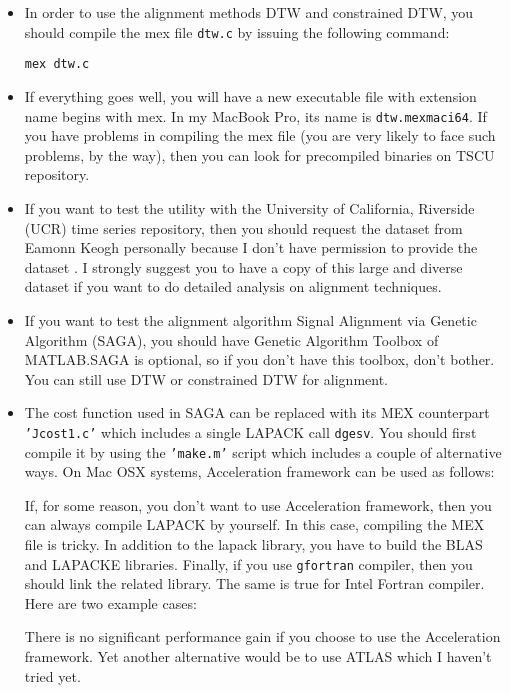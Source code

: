 \documentclass{article}
\newcommand{\parametre}[1]{\texttt{#1}}
\newcommand{\matlabfile}[1]{}
\begin{document}
\begin{itemize}
\item%
In order to use the alignment methods DTW and constrained DTW, you should compile the mex file \parametre{dtw.c} by issuing the following command:
\begin{verbatim}
mex dtw.c
\end{verbatim}

\item%
If everything goes well, you will have a new executable file with extension name begins with mex. In my MacBook Pro, its name is \verb|dtw.mexmaci64|. If you have problems in compiling the mex file (you are very likely to face such problems, by the way), then you can look for precompiled binaries on TSCU repository.

\item%
If you want to test the utility with the University of California, Riverside (UCR) time series repository, then you should request the dataset from Eamonn Keogh personally because I don't have permission to provide the dataset \cite{UCRWeb}. I strongly suggest you to have a copy of this large and diverse dataset if you want to do detailed analysis on alignment techniques.

\item%
If you want to test the alignment algorithm Signal Alignment via Genetic Algorithm (SAGA), you should have Genetic Algorithm Toolbox of MATLAB.\@ SAGA is optional, so if you don't have this toolbox, don't bother. You can still use DTW or constrained DTW for alignment.

\item%
The cost function used in SAGA can be replaced with its MEX counterpart \parametre{'Jcost1.c'} which includes a single LAPACK call \parametre{dgesv}. You should first compile it by using the \parametre{'make.m'} script which includes a couple of alternative ways. On Mac OSX systems, Acceleration framework can be used as follows:
\begin{scriptsize}
\matlabfile{tscu_manual_verbatim06.out}
\end{scriptsize}

If, for some reason, you don't want to use Acceleration framework, then you can always compile LAPACK by yourself. In this case, compiling the MEX file is tricky. In addition to the lapack library, you have to build the BLAS and LAPACKE libraries. Finally, if you use \parametre{gfortran} compiler, then you should link the related library. The same is true for Intel Fortran compiler. Here are two example cases:

\begin{scriptsize}
\matlabfile{tscu_manual_verbatim05.out}
\end{scriptsize}

There is no significant performance gain if you choose to use the Acceleration framework. 
Yet another alternative would be to use ATLAS which I haven't tried yet. 
\end{itemize}
\end{document}
